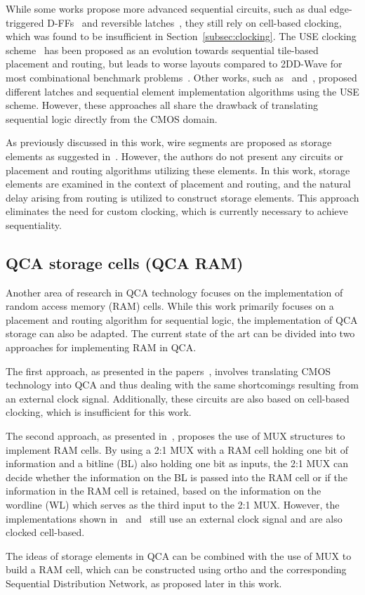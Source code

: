 While some works propose more advanced sequential circuits, such as dual edge-triggered D-FFs~\cite{dual_edge_triggered_FF_cell} and reversible latches~\cite{sequential_reversible_cell}, they still rely on cell-based clocking, which was found to be insufficient in Section~\ref{subsec:clocking}. The USE clocking scheme~\cite{USE} has been proposed as an evolution towards sequential tile-based placement and routing, but leads to worse layouts compared to 2DD-Wave for most combinational benchmark problems~\cite{walter2018exact}. Other works, such as~\cite{sequential_reversible_tile} and~\cite{sequential_tile_CMOS_alg}, proposed different latches and sequential element implementation algorithms using the USE scheme. However, these approaches all share the drawback of translating sequential logic directly from the CMOS domain.

As previously discussed in this work, wire segments are proposed as storage elements as suggested in~\cite{Walter}. However, the authors do not present any circuits or placement and routing algorithms utilizing these elements. In this work, storage elements are examined in the context of placement and routing, and the natural delay arising from routing is utilized to construct storage elements. This approach eliminates the need for custom clocking, which is currently necessary to achieve sequentiality.

\subsection{QCA storage cells (QCA RAM)}\label{subsec:RAM_SoA}
Another area of research in QCA technology focuses on the implementation of random access memory (RAM) cells. While this work primarily focuses on a placement and routing algorithm for sequential logic, the implementation of QCA storage can also be adapted. The current state of the art can be divided into two approaches for implementing RAM in QCA.

The first approach, as presented in the papers~\cite{RAM_overview, crosstalk, RAM_cell}, involves translating CMOS technology into QCA and thus dealing with the same shortcomings resulting from an external clock signal. Additionally, these circuits are also based on cell-based clocking, which is insufficient for this work.

The second approach, as presented in~\cite{ahmad2018optimal, majeed2019optimal}, proposes the use of MUX structures to implement RAM cells. By using a 2:1 MUX with a RAM cell holding one bit of information and a bitline (BL) also holding one bit as inputs, the 2:1 MUX can decide whether the information on the BL is passed into the RAM cell or if the information in the RAM cell is retained, based on the information on the wordline (WL) which serves as the third input to the 2:1 MUX. However, the implementations shown in~\cite{ahmad2018optimal} and~\cite{majeed2019optimal} still use an external clock signal and are also clocked cell-based.

The ideas of storage elements in QCA can be combined with the use of MUX to build a RAM cell, which can be constructed using ortho and the corresponding Sequential Distribution Network, as proposed later in this work.
